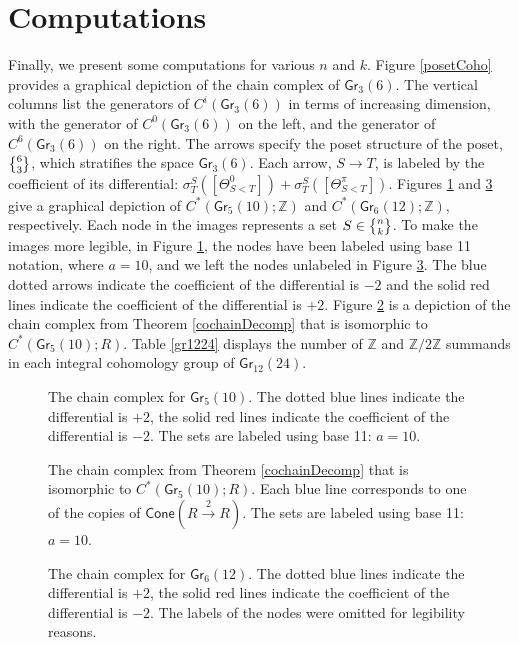 \documentclass{article}
\newcommand{\bb}[1]{\mathbb{#1}}
\newcommand{\msf}[1]{\mathsf{#1}}
\newcommand{\gr}{\msf{Gr}}
\newcommand{\nchoosek}{\textstyle\genfrac{\lbrace}{\rbrace}{0pt}{}}
\newcommand{\cone}{\msf{Cone}}
\newcommand{\Z}{\mathbb{Z}}
\theoremstyle{definition}
\begin{document}
\section{Computations}\label{sec:computations}
Finally, we present some computations for various $n$ and $k$.
Figure \ref{posetCoho} provides a graphical depiction of the chain complex of $\gr_3(6)$. The vertical columns
list the generators of $C^i(\gr_3(6))$ in terms of increasing dimension, with the generator of $C^0(\gr_3(6))$ on 
the left, and the generator of $C^6(\gr_3(6))$ on the right. The arrows specify the poset structure of the poset,
$\nchoosek{6}{3}$, which stratifies the space $\gr_3(6)$. Each arrow, $S \to T$, is labeled by the coefficient of its 
differential: $\sigma^S_T([\Theta_{S<T}^0]) + \sigma^S_T([\Theta_{S<T}^\pi])$. 
Figures \ref{gr510} and \ref{gr612} give a graphical depiction of $C^*(\gr_5(10);\bb{Z})$ and 
$C^*(\gr_6(12);\bb{Z})$, respectively. 
Each node in the images represents a set $S \in \nchoosek{n}{k}$. To make the images more legible,
in Figure \ref{gr510}, the nodes have been labeled using base 11 notation, where $a=10$, and we left the nodes
unlabeled in Figure \ref{gr612}.
The blue dotted arrows indicate the coefficient of the differential is $-2$
and the solid red lines indicate the coefficient of the differential is $+2$. 
Figure \ref{gr510WL} is a depiction of the chain complex from Theorem \ref{cochainDecomp} that is isomorphic to $C^*(\gr_5(10);R)$.
Table \ref{gr1224} displays the number of $\Z$ and $\Z/2\Z$ summands in each integral cohomology group
of $\gr_{12}(24)$.

\begin{figure}[H]
\centering
\scalebox{.6}{}
\caption{ The chain complex for $\gr_5(10)$. The dotted blue lines indicate the differential is $+2$, the solid
red lines indicate the coefficient of the differential is $-2$. The sets are labeled using base 11: $a = 10$.}
\label{gr510}
\end{figure}

\begin{figure}[H]
\centering
\scalebox{.6}{}
\caption{ The chain complex from Theorem \ref{cochainDecomp} that is isomorphic to $C^*(\gr_5(10);R)$. Each blue line corresponds to one of the copies of $\cone(R\xrightarrow{2}R)$. The sets are labeled using base 11: $a = 10$.}
\label{gr510WL}
\end{figure}

\begin{figure}[H]
\centering
\scalebox{.55}{}
\caption{ The chain complex for $\gr_6(12)$. The dotted blue lines indicate the differential is $+2$, the solid
red lines indicate the coefficient of the differential is $-2$. The labels of the nodes were omitted for legibility reasons.}
\label{gr612}
\end{figure}
\end{document}
